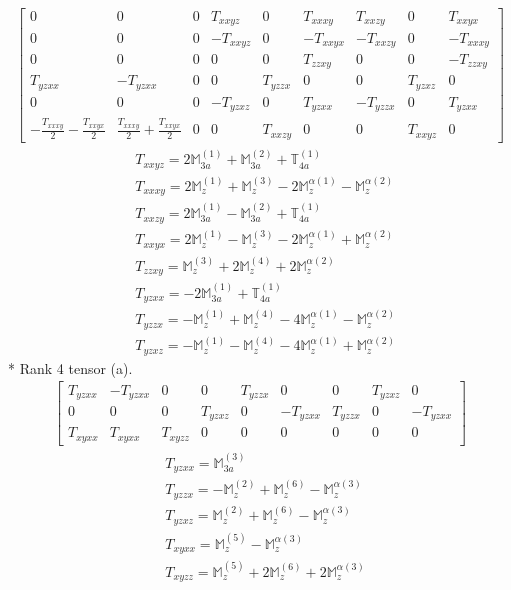 \documentclass[fleqn,8pt,landscape]{jsarticle}
\begin{document}
\begin{align*}
\begin{bmatrix} 0 & 0 & 0 & T_{xxyz} & 0 & T_{xxxy} & T_{xxzy} & 0 & T_{xxyx} \\ 0 & 0 & 0 & - T_{xxyz} & 0 & - T_{xxyx} & - T_{xxzy} & 0 & - T_{xxxy} \\ 0 & 0 & 0 & 0 & 0 & T_{zzxy} & 0 & 0 & - T_{zzxy} \\ T_{yzxx} & - T_{yzxx} & 0 & 0 & T_{yzzx} & 0 & 0 & T_{yzxz} & 0 \\ 0 & 0 & 0 & - T_{yzxz} & 0 & T_{yzxx} & - T_{yzzx} & 0 & T_{yzxx} \\ - \frac{T_{xxxy}}{2} - \frac{T_{xxyx}}{2} & \frac{T_{xxxy}}{2} + \frac{T_{xxyx}}{2} & 0 & 0 & T_{xxzy} & 0 & 0 & T_{xxyz} & 0 \end{bmatrix}
\end{align*}
\begin{align*}
& T_{xxyz} = 2 \mathbb{M}_{3a}^{(1)} + \mathbb{M}_{3a}^{(2)} + \mathbb{T}_{4a}^{(1)} \\
& T_{xxxy} = 2 \mathbb{M}_{z}^{(1)} + \mathbb{M}_{z}^{(3)} - 2 \mathbb{M}_{z}^{\alpha(1)} - \mathbb{M}_{z}^{\alpha(2)} \\
& T_{xxzy} = 2 \mathbb{M}_{3a}^{(1)} - \mathbb{M}_{3a}^{(2)} + \mathbb{T}_{4a}^{(1)} \\
& T_{xxyx} = 2 \mathbb{M}_{z}^{(1)} - \mathbb{M}_{z}^{(3)} - 2 \mathbb{M}_{z}^{\alpha(1)} + \mathbb{M}_{z}^{\alpha(2)} \\
& T_{zzxy} = \mathbb{M}_{z}^{(3)} + 2 \mathbb{M}_{z}^{(4)} + 2 \mathbb{M}_{z}^{\alpha(2)} \\
& T_{yzxx} = - 2 \mathbb{M}_{3a}^{(1)} + \mathbb{T}_{4a}^{(1)} \\
& T_{yzzx} = - \mathbb{M}_{z}^{(1)} + \mathbb{M}_{z}^{(4)} - 4 \mathbb{M}_{z}^{\alpha(1)} - \mathbb{M}_{z}^{\alpha(2)} \\
& T_{yzxz} = - \mathbb{M}_{z}^{(1)} - \mathbb{M}_{z}^{(4)} - 4 \mathbb{M}_{z}^{\alpha(1)} + \mathbb{M}_{z}^{\alpha(2)}
\end{align*}
* Rank 4 tensor (a).
\begin{align*}
\begin{bmatrix} T_{yzxx} & - T_{yzxx} & 0 & 0 & T_{yzzx} & 0 & 0 & T_{yzxz} & 0 \\ 0 & 0 & 0 & T_{yzxz} & 0 & - T_{yzxx} & T_{yzzx} & 0 & - T_{yzxx} \\ T_{xyxx} & T_{xyxx} & T_{xyzz} & 0 & 0 & 0 & 0 & 0 & 0 \end{bmatrix}
\end{align*}
\begin{align*}
& T_{yzxx} = \mathbb{M}_{3a}^{(3)} \\
& T_{yzzx} = - \mathbb{M}_{z}^{(2)} + \mathbb{M}_{z}^{(6)} - \mathbb{M}_{z}^{\alpha(3)} \\
& T_{yzxz} = \mathbb{M}_{z}^{(2)} + \mathbb{M}_{z}^{(6)} - \mathbb{M}_{z}^{\alpha(3)} \\
& T_{xyxx} = \mathbb{M}_{z}^{(5)} - \mathbb{M}_{z}^{\alpha(3)} \\
& T_{xyzz} = \mathbb{M}_{z}^{(5)} + 2 \mathbb{M}_{z}^{(6)} + 2 \mathbb{M}_{z}^{\alpha(3)}
\end{align*}
\end{document}
